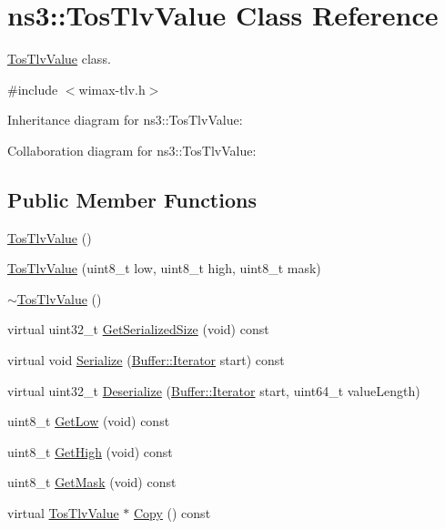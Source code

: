 \hypertarget{classns3_1_1TosTlvValue}{}\section{ns3\+:\+:Tos\+Tlv\+Value Class Reference}
\label{classns3_1_1TosTlvValue}


\hyperlink{classns3_1_1TosTlvValue}{Tos\+Tlv\+Value} class.  




{\ttfamily \#include $<$wimax-\/tlv.\+h$>$}



Inheritance diagram for ns3\+:\+:Tos\+Tlv\+Value\+:


Collaboration diagram for ns3\+:\+:Tos\+Tlv\+Value\+:
\subsection*{Public Member Functions}
\begin{DoxyCompactItemize}
\item 
\hyperlink{classns3_1_1TosTlvValue_aae794a5bb6be697da133b5d73682f7b0}{Tos\+Tlv\+Value} ()
\item 
\hyperlink{classns3_1_1TosTlvValue_a0a0eecd45f6dc942dd689bfd982236a7}{Tos\+Tlv\+Value} (uint8\+\_\+t low, uint8\+\_\+t high, uint8\+\_\+t mask)
\item 
\hyperlink{classns3_1_1TosTlvValue_ad5ea339e35ae77b8e65866a96f96530c}{$\sim$\+Tos\+Tlv\+Value} ()
\item 
virtual uint32\+\_\+t \hyperlink{classns3_1_1TosTlvValue_a0f59a3cfcbfcd4e036d36065e42c08a0}{Get\+Serialized\+Size} (void) const 
\item 
virtual void \hyperlink{classns3_1_1TosTlvValue_a3537faac176e4539e4ea727d1ff0fa04}{Serialize} (\hyperlink{classns3_1_1Buffer_1_1Iterator}{Buffer\+::\+Iterator} start) const 
\item 
virtual uint32\+\_\+t \hyperlink{classns3_1_1TosTlvValue_a3db79b485d75c9260e014e77638bff5b}{Deserialize} (\hyperlink{classns3_1_1Buffer_1_1Iterator}{Buffer\+::\+Iterator} start, uint64\+\_\+t value\+Length)
\item 
uint8\+\_\+t \hyperlink{classns3_1_1TosTlvValue_a72706b2233b824eba337ce91adafda3e}{Get\+Low} (void) const 
\item 
uint8\+\_\+t \hyperlink{classns3_1_1TosTlvValue_a53da39f21e6c5e3b39d9acaee8c1bb2b}{Get\+High} (void) const 
\item 
uint8\+\_\+t \hyperlink{classns3_1_1TosTlvValue_a8c287b9c3bf5ed28be5abfedea0f969c}{Get\+Mask} (void) const 
\item 
virtual \hyperlink{classns3_1_1TosTlvValue}{Tos\+Tlv\+Value} $\ast$ \hyperlink{classns3_1_1TosTlvValue_aa05527de152176176360e65bec92d5a1}{Copy} () const 
\end{DoxyCompactItemize}
